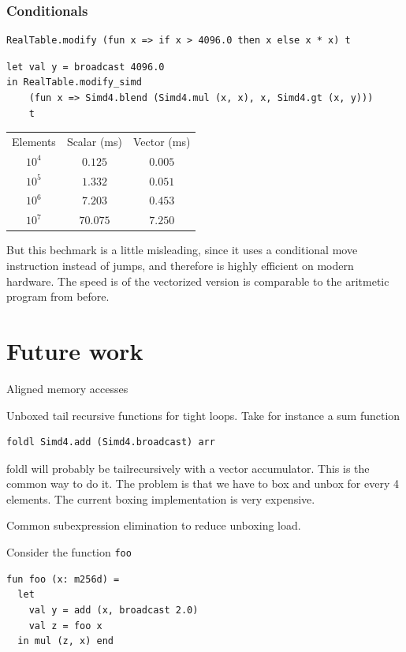 \documentclass{article}
\begin{document}
\subsubsection{Conditionals}

\begin{lstlisting}
RealTable.modify (fun x => if x > 4096.0 then x else x * x) t
\end{lstlisting}

\begin{lstlisting}
let val y = broadcast 4096.0
in RealTable.modify_simd
    (fun x => Simd4.blend (Simd4.mul (x, x), x, Simd4.gt (x, y)))
    t
\end{lstlisting}

\begin{center}
\begin{tabular}{ c c c }
    Elements & Scalar (ms) & Vector (ms) \\
    $10^4$ & $0.125$ & $0.005$ \\
    $10^5$ & $1.332$ & $0.051$ \\
    $10^6$ & $7.203$ & $0.453$ \\
    $10^7$ & $70.075$ & $7.250$
\end{tabular}
\end{center}

But this bechmark is a little misleading, since it uses a conditional move instruction instead of jumps, and therefore is highly efficient on modern hardware. The speed is of the vectorized version is comparable to the aritmetic program from before.

\section{Future work}

Aligned memory accesses

Unboxed tail recursive functions for tight loops. Take for instance a sum function

\begin{lstlisting}
foldl Simd4.add (Simd4.broadcast) arr
\end{lstlisting}

foldl will probably be tailrecursively with a vector accumulator. This is the common way to do it. The problem is that we have to box and unbox for every 4 elements. The current boxing implementation is very expensive.

Common subexpression elimination to reduce unboxing load.

Consider the function \texttt{foo}
\begin{lstlisting}
fun foo (x: m256d) =
  let
    val y = add (x, broadcast 2.0)
    val z = foo x
  in mul (z, x) end
\end{lstlisting}
\end{document}
